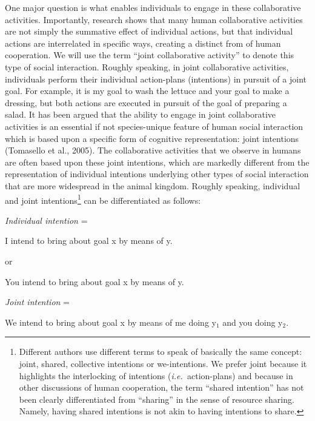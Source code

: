 \documentclass{article}
\newcommand{\ie}{{\textit{i.e.~}}}
\begin{document}
One major question is what enables individuals to engage in these collaborative
activities. Importantly, research shows that many human collaborative
activities are not simply the summative effect of individual actions, but that
individual actions are interrelated in specific ways, creating a distinct from
of human cooperation. We will use the term ``joint collaborative activity{}''
to denote this type of social interaction. Roughly speaking, in joint
collaborative activities, individuals perform their individual action-plans
(intentions) in pursuit of a joint goal. For example, it is my goal to wash the
lettuce and your goal to make a dressing, but both actions are executed in
pursuit of the goal of preparing a salad. It has been argued that the ability
to engage in joint collaborative activities is an essential if not
species-unique feature of human social interaction which is based upon a
specific form of cognitive representation: joint intentions (Tomasello et al.,
2005). The collaborative activities that we observe in humans are often based
upon these joint intentions, which are markedly different from the
representation of individual intentions underlying other types of social
interaction that are more widespread in the animal kingdom. Roughly speaking,
individual and joint intentions\footnote{ Different authors use different terms
to speak of basically the same concept: joint, shared, collective intentions or
we-intentions. We prefer joint because it highlights the interlocking of
intentions (\ie action-plans) and because in other discussions of human
cooperation, the term ``shared intention'' has not been clearly differentiated
from ``sharing'' in the sense of resource sharing. Namely, having shared
intentions is not akin to having intentions to share.\par } can be
differentiated as follows:

\textit{Individual intention} =

I intend to bring about goal x by means of y.

or

You intend to bring about goal x by means of y.

\textit{Joint intention} = 

We intend to bring about goal x by means of me doing y$_1$ and you
doing y$_2$.
\end{document}
